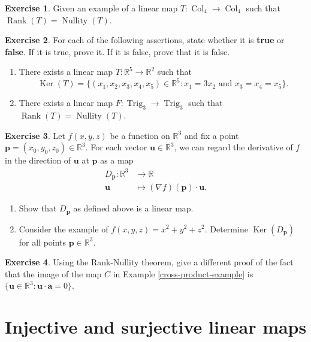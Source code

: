 \documentclass[a4paper,11pt]{book}
\theoremstyle{definition}
\newtheorem{exercise}{Exercise}
\newcommand{\ve}[1]{\mathbf{#1}}
\DeclareMathOperator{\Trig}{Trig}
\DeclareMathOperator{\Col}{Col}
\DeclareMathOperator{\Ker}{Ker}
\DeclareMathOperator{\Nullity}{Nullity}
\DeclareMathOperator{\Rank}{Rank}
\begin{document}
\begin{exercise} Given an example of a linear map $T : \Col_4 \rightarrow \Col_4$ such that $\Rank(T) = \Nullity(T)$. 
\end{exercise}

\begin{exercise} For each of the following assertions, state whether it is {\bf true} or {\bf false}. If it is true, prove it. If it is false, prove that it is false.
\begin{enumerate}
 \item There exists a linear map $T : \mathbb{R}^5 \rightarrow \mathbb{R}^2$ such that 
 \[
  \Ker(T) = \{ (x_1, x_2, x_3, x_4, x_5) \in \mathbb{R}^5 : x_1 = 3x_2 \text{ and } x_3 = x_4 = x_5\}.
 \]
 \item There exists a linear map $F : \Trig_3 \rightarrow \Trig_3$ such that $\Rank(T) = \Nullity(T)$. 
\end{enumerate}
\end{exercise}

\begin{exercise} Let $f(x,y,z)$ be a function on $\mathbb{R}^3$ and fix a point $\ve{p} = (x_0, y_0, z_0) \in \mathbb{R}^3$. For each vector $\ve{u} \in \mathbb{R}^3$,  we can regard the derivative of $f$ in the direction of $\ve{u}$ at $\ve{p}$ as a map
\begin{align*}
 D_{\ve{p}} : \mathbb{R}^3 &\rightarrow \mathbb{R} \\
  \ve{u} &\mapsto (\nabla f)(\ve{p}) \cdot \ve{u}.
\end{align*}
\begin{enumerate} 
\item Show that $D_{\ve{p}}$ as defined above is a linear map. 
\item Consider the example of $f(x,y,z) = x^2 + y^2 + z^2$. Determine $\Ker(D_\ve{p})$ for all points $\ve{p} \in \mathbb{R}^3$.
\end{enumerate}
\end{exercise}


\begin{exercise} Using the Rank-Nullity theorem, give a different proof of the fact that the image of the map $C$ in Example \ref{cross-product-example} is $\{ \ve{u} \in \mathbb{R}^3 : \ve{u} \cdot \ve{a} = 0 \}$.
\end{exercise}

\section{Injective and surjective linear maps} \label{Ch3Sec6InjectiveSurjective}
\end{document}
